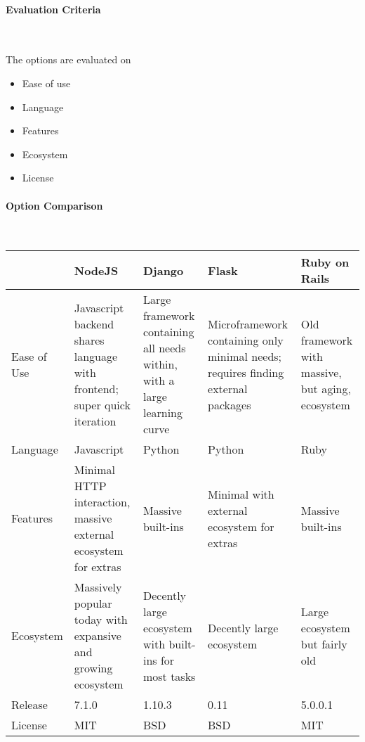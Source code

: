 \documentclass[letterpaper, 10pt, draftclsnofoot, compsoc, onecolumn]{IEEEtran}
\begin{document}
{\medskip
\newpage
\paragraph{Evaluation Criteria} ~\\
{\noindent The options are evaluated on

\begin{itemize}
\item Ease of use
\item Language
\item Features
\item Ecosystem
\item License
\end{itemize}

 \par}


\newpage
\paragraph{Option Comparison} ~\\
\vspace{1pc}
\tablehead{}
\begin{supertabular}{|p{2cm}|p{2.5cm}|p{2.5cm}|p{2.5cm}|p{2.5cm}|}
\hline & NodeJS & Django  & Flask  & Ruby on Rails \\ \hline
Ease of Use
  & Javascript backend shares language with frontend; super quick iteration
  & Large framework containing all needs within, with a large learning curve
  & Microframework containing only minimal needs; requires finding external packages
  & Old framework with massive, but aging, ecosystem \\ \hline
Language
  & Javascript
  & Python
  & Python
  & Ruby \\ \hline
Features
  & Minimal HTTP interaction, massive external ecosystem for extras
  & Massive built-ins
  & Minimal with external ecosystem for extras
  & Massive built-ins \\ \hline
Ecosystem
  & Massively popular today with expansive and growing ecosystem
  & Decently large ecosystem with built-ins for most tasks
  & Decently large ecosystem
  & Large ecosystem but fairly old \\ \hline
Release
  & 7.1.0
  & 1.10.3
  & 0.11
  & 5.0.0.1 \\ \hline
License
  & MIT
  & BSD
  & BSD
  & MIT \\ \hline
\end{supertabular}

}
\end{document}
